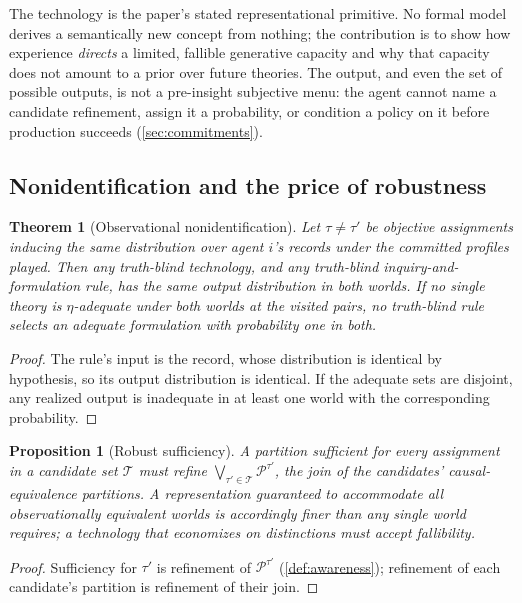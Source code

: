 \documentclass[11pt]{article}
\newtheorem{proposition}[assumption]{Proposition}
\newtheorem{theorem}[assumption]{Theorem}
\theoremstyle{definition}
\begin{document}
The technology is the paper's stated representational primitive.  No formal
model derives a semantically new concept from nothing; the contribution is to
show how experience \emph{directs} a limited, fallible generative capacity
and why that capacity does not amount to a prior over future theories.  The
output, and even the set of possible outputs, is not a pre-insight
subjective menu: the agent cannot name a candidate refinement, assign it a
probability, or condition a policy on it before production succeeds
(\cref{sec:commitments}).

\subsection{Nonidentification and the price of robustness}

\begin{theorem}[Observational nonidentification]
\label{thm:nonidentification}
Let $\tau\neq\tau'$ be objective assignments inducing the same distribution
over agent $i$'s records under the committed profiles played.  Then any
truth-blind technology, and any truth-blind inquiry-and-formulation rule,
has the same output distribution in both worlds.  If no single theory is
$\eta$-adequate under both worlds at the visited pairs, no truth-blind rule
selects an adequate formulation with probability one in both.
\end{theorem}

\begin{proof}
The rule's input is the record, whose distribution is identical by
hypothesis, so its output distribution is identical.  If the adequate sets
are disjoint, any realized output is inadequate in at least one world with
the corresponding probability.
\end{proof}

\begin{proposition}[Robust sufficiency]
\label{prop:robust-sufficiency}
A partition sufficient for every assignment in a candidate set $\mathcal T$
must refine $\bigvee_{\tau'\in\mathcal T}\mathcal P^{\tau'}$, the join of the
candidates' causal-equivalence partitions.  A representation guaranteed to
accommodate all observationally equivalent worlds is accordingly finer than
any single world requires; a technology that economizes on distinctions must
accept fallibility.
\end{proposition}

\begin{proof}
Sufficiency for $\tau'$ is refinement of $\mathcal P^{\tau'}$
(\cref{def:awareness}); refinement of each candidate's partition is
refinement of their join.
\end{proof}
\end{document}
